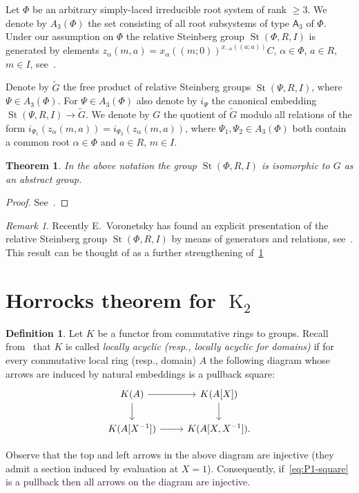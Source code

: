 \documentclass[oneside, 10pt]{amsart}
\DeclareMathOperator{\St}{St}
\DeclareMathOperator{\K}{K}
\newcommand{\rA}{\mathsf{A}}
\newcommand{\inv}{^{-1}}
\newtheorem{thm}{Theorem}
\numberwithin{equation}{section}
\numberwithin{thm}{section}
\numberwithin{lemma}{section}
\theoremstyle{definition}
\newtheorem{dfn}[lemma]{Definition}
\theoremstyle{remark}
\newtheorem{rem}[lemma]{Remark}
\begin{document}
Let $\Phi$ be an arbitrary simply-laced irreducible root system of rank $\geq 3$.
We denote by $A_3(\Phi)$ the set consisting of all root subsystems of type $\rA_3$ of $\Phi$.
Under our assumption on $\Phi$ the relative Steinberg group $\St(\Phi, R, I)$ is generated by elements
$z_\alpha(m, a) = x_\alpha((m; 0))^{x_{-\alpha}((a; a))}C$, $\alpha \in \Phi$, $a \in R$, $m \in I$, see~\cite[\S~3.1]{S15}.

Denote by $\widetilde{G}$ the free product of relative Steinberg groups $\St(\Psi, R, I)$, where $\Psi \in A_3(\Phi)$.
For $\Psi \in A_3(\Phi)$ also denote by $i_\Psi$ the canonical embedding $\St(\Psi, R, I) \to \widetilde{G}$.
We denote by $G$ the quotient of $\widetilde{G}$ modulo all relations of the form $i_{\Psi_1}(z_\alpha(m, a)) = i_{\Psi_2}(z_\alpha(m, a))$,
where $\Psi_1, \Psi_2 \in A_3(\Phi)$ both contain a common root $\alpha \in \Phi$ and $a\in R$, $m \in I$.

\begin{thm}\label{thm:relPres} In the above notation the group $\St(\Phi, R, I)$ is isomorphic to $G$ as an abstract group. \end{thm}
\begin{proof}
See~\cite[\S~2]{LS20}.
\end{proof}

\begin{rem}
Recently E.~Voronetsky has found an explicit presentation of the relative Steinberg group $\St(\Phi, R, I)$
by means of generators and relations, see~\cite{V22}.
This result can be thought of as a further strengthening of~\cref{thm:relPres}
\end{rem}


\section{Horrocks theorem for \texorpdfstring{$\K_2$}{K₂}} \label{sec:horrocks}
\begin{dfn}
Let $K$ be a functor from commutative rings to groups.
Recall from~\cite{LSV2} that $K$ is called \textit{locally acyclic (resp., locally acyclic for domains)} if for every commutative local ring (resp., domain)
$A$ the following diagram whose arrows are induced by natural embeddings is a pullback square:
\begin{equation}\label{eq:P1-square} \begin{tikzcd} K(A) \ar[r] \ar[d] & K(A[X]) \arrow{d} \\ K(A[X\inv]) \ar{r} & K(A[X, X\inv]). \end{tikzcd} \end{equation}
\end{dfn}
Observe that the top and left arrows in the above diagram are injective (they admit a section induced by evaluation at $X=1$).
Consequently, if~\eqref{eq:P1-square} is a pullback then all arrows on the diagram are injective.
\end{document}
